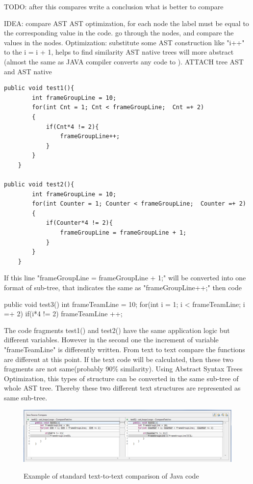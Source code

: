 \documentclass{report}
\begin{document}
TODO: after this compares write a conclusion what is better to compare

IDEA: compare AST
AST optimization, for each node the label must be equal to the corresponding value in the code.
go through the nodes, and compare the values in the nodes.
Optimization: substitute some AST construction like "i++" to the i = i + 1, helps to find similarity
AST native trees will more abstract (almost the same as JAVA compiler converts any code to ).
ATTACH tree AST and AST native

\begin{lstlisting}
public void test1(){
		int frameGroupLine = 10;
		for(int Cnt = 1; Cnt < frameGroupLine;  Cnt =+ 2)
		{
			if(Cnt*4 != 2){
				frameGroupLine++;
			}
		}
	}
	
public void test2(){
		int frameGroupLine = 10;
		for(int Counter = 1; Counter < frameGroupLine;  Counter =+ 2)
		{
			if(Counter*4 != 2){ 
				frameGroupLine = frameGroupLine + 1;
			}
		}
	}	
\end{lstlisting}

If this line "frameGroupLine = frameGroupLine + 1;" will be converted into one format of sub-tree, that indicates the same as "frameGroupLine++;" then code

	public void test3(){
		int frameTeamLine = 10;
		for(int i = 1; i < frameTeamLine;  i =+ 2)
		{
			if(i*4 != 2){ 
				frameTeamLine ++;
			}
		}
	}

The code fragments test1() and test2() have the same application logic but different variables. However in the second one the increment of variable "frameTeamLine" is differently written. From text to text compare the functions are different at this point. If the text code will be calculated, then these two fragments are not same(probably 90\% similarity). Using Abstract Syntax Trees Optimization, this types of structure can be converted in the same sub-tree of whole AST tree. Thereby these two different text structures are represented as same sub-tree. 

\vspace{4mm}

\begin{figure}[hb]
  \centering
  \includegraphics[width=1.00\textwidth]{Figures/AST-optimization/text-to-text-compare}\\[0.1cm]
  \caption[Text to text comparison example]{Example of standard text-to-text comparison of Java code}
  \label{fig:text-to-text-compare}
\end{figure}
\end{document}
